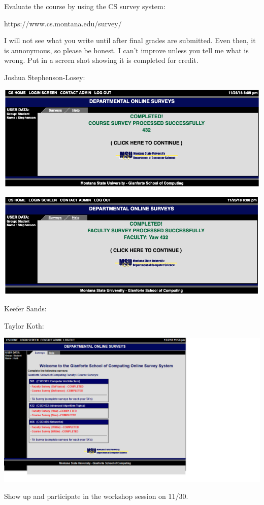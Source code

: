 \documentclass[12pt]{article}
\newenvironment{problem}[2][Problem]
{\begin{trivlist}
\item[\hskip \labelsep {\bfseries #1}\hskip \labelsep {\bfseries #2.}]}{\end{trivlist}}
\begin{document}
\begin{problem}{3*}
Evaluate the course by using the CS survey system: 

https://www.cs.montana.edu/survey/

I will not see what you write until after final grades are submitted. Even then, it is annonymous, so please be honest. I can't improve unless you tell me what is wrong. Put in a screen shot showing it is completed for credit.

Joshua Stephenson-Losey:

\includegraphics[scale = .33]{Surveys/SL_432.png}

\includegraphics[scale = .33]{Surveys/SL_432_yaw.png}

Keefer Sands:

Taylor Koth:

\includegraphics[scale = .33]{Surveys/Koth_Survey_Screenshot.png}

\end{problem}

\begin{problem}{4}
Show up and participate in the workshop session on 11/30.
\end{problem}
 
\end{document}

